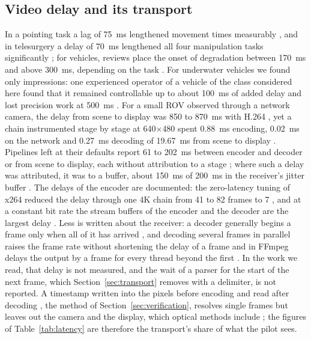 \subsection{Video delay and its transport}\label{sec:rw-latency}

In a pointing task a lag of 75~ms lengthened movement times measurably
\cite{mackenzie1993}, and in telesurgery a delay of 70~ms lengthened all four
manipulation tasks significantly \cite{nankaku2022}; for vehicles, reviews place
the onset of degradation between 170~ms and above 300~ms, depending on the task
\cite{chen2007,kamtam2024}. For underwater vehicles we found only impressions:
one experienced operator of a vehicle of the class considered here found that it
remained controllable up to about 100~ms of added delay and lost precision work
at 500~ms \cite{bauer2025}. For a small ROV observed through a network camera,
the delay from scene to display was 850 to 870~ms with H.264
\cite{kaknjo2018}, yet a chain instrumented stage by stage at 640$\times$480
spent 0.88~ms encoding, 0.02~ms on the network and 0.27~ms decoding of 19.67~ms
from scene to display \cite{bachhuber2018}. Pipelines left at their defaults
report 61 to 202~ms between encoder and decoder or from scene to display, each
without attribution to a stage
\cite{green2021,khalil2026,schimpe2022,jennehag2016,testouri2025}; where such a
delay was attributed, it was to a buffer, about 150~ms of 200~ms in the
receiver's jitter buffer \cite{baltaci2022}. The delays of the encoder are
documented: the zero-latency tuning of x264 reduced the delay through one 4K
chain from 41 to 82 frames to 7 \cite{arunruangsirilert2025}, and at a constant
bit rate the stream buffers of the encoder and the decoder are the largest delay
\cite{schreier2006,schreier2008}. Less is written about the receiver: a decoder
generally begins a frame only when all of it has arrived \cite{schreier2006},
and decoding several frames in parallel raises the frame rate without shortening
the delay of a frame \cite{chi2012} and in FFmpeg delays the output by a frame
for every thread beyond the first \cite{ffmpegmt}. In the work we read, that
delay is not measured, and the wait of a parser for the start of the next frame,
which Section~\ref{sec:transport} removes with a delimiter, is not reported. A
timestamp written into the pixels before encoding and read after decoding
\cite{green2021,khalil2026,baltaci2022}, the method of
Section~\ref{sec:verification}, resolves single frames but leaves out the camera
and the display, which optical methods include \cite{bachhuber2016,georg2020};
the figures of Table~\ref{tab:latency} are therefore the transport's share of
what the pilot sees.

